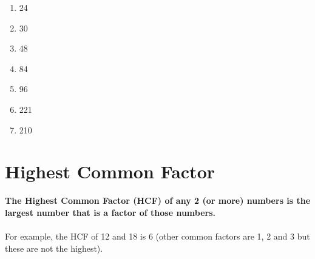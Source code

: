 \documentclass[a4paper,12pt]{article}
\begin{document}
\begin{tcolorbox}[colback=red!0!white, colframe=gray ,title=\subsubsection{Draw Factor Trees for the following numbers and write the numbers as a product of prime factors:}\label{factortrees}]

\begin{multicols}{4}
	\begin{enumerate}[label= \roman*)]
		\item 24 
		\item 30     
		\item 48       
		\item 84     
		\item 96    
		\item 221   
		\item 210
	\end{enumerate}
\end{multicols}
\end{tcolorbox}\vspace{1cm}
 
\section{Highest Common Factor}
\textbf{The Highest Common Factor (HCF) of any 2 (or more) numbers is the largest number that is a factor of those numbers.}\\\\
For example, the HCF of 12 and 18 is 6 (other common factors are 1, 2 and 3 but these are not the highest).
\end{document}
